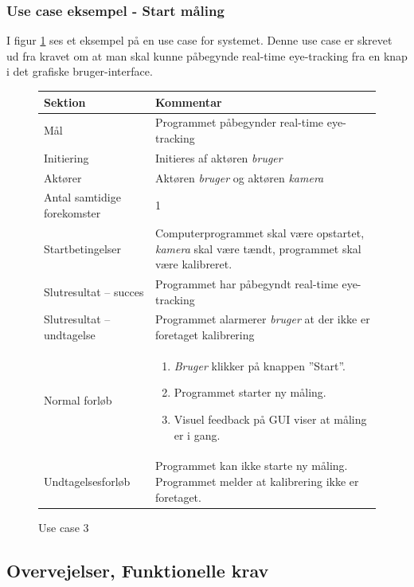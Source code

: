 \documentclass[a4paper,oneside,12pt]{article}
\begin{document}
		\subsubsection{Use case eksempel - Start måling}
		I figur \ref{fig:UseCase3} ses et eksempel på en use case for systemet. Denne use case er skrevet ud fra kravet om at man skal kunne påbegynde real-time eye-tracking fra en knap i det grafiske bruger-interface.
		
		\begin{figure}
		\caption{Use case 3}
		\label{fig:UseCase3}
		\begin{tabular}{|l|p{7.7cm}|}
			\hline \textbf{Sektion} 	& \textbf{Kommentar} \\ 
			\hline Mål  & Programmet påbegynder real-time eye-tracking \\ 
			\hline Initiering  & Initieres af aktøren \textit{bruger} \\ 
			\hline Aktører & Aktøren \textit{bruger} og aktøren \textit{kamera} \\ 
			\hline Antal samtidige forekomster & 1 \\ 
			\hline Startbetingelser & Computerprogrammet skal være opstartet, \textit{kamera} skal være tændt, programmet skal være kalibreret. \\ 
			\hline Slutresultat – succes & Programmet har påbegyndt real-time eye-tracking\\ 
			\hline Slutresultat – undtagelse & Programmet alarmerer \textit{bruger} at der ikke er foretaget kalibrering \\ 
			\hline Normal forløb & \begin{enumerate}
				\item \textit{Bruger} klikker på knappen ”Start”.
				\item Programmet starter ny måling.
				\item Visuel feedback på GUI viser at måling er i gang.
			\end{enumerate} \\  
			\hline Undtagelsesforløb & Programmet kan ikke starte ny måling. Programmet melder
			at kalibrering ikke er foretaget.\\
			\hline 
		\end{tabular}
		\end{figure}
		
	\subsection{Overvejelser, Funktionelle krav}	
	
\end{document}

